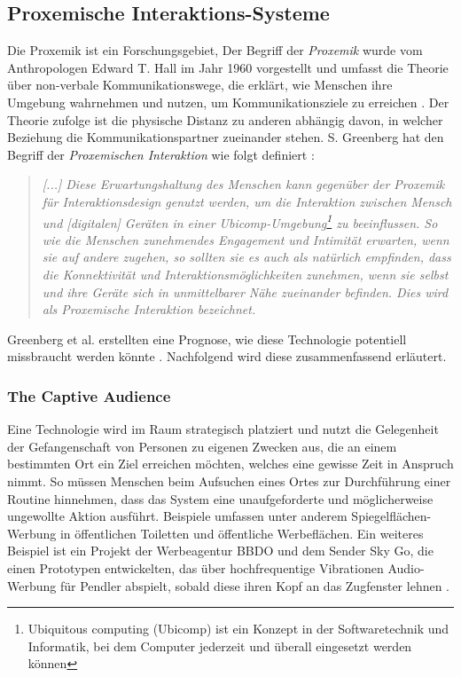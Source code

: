 \documentclass[a4paper]{article}
\begin{document}
\subsection{Proxemische Interaktions-Systeme}
\label{sub:proxemische_interaktions-systeme}{}
Die Proxemik ist ein Forschungsgebiet, 
Der Begriff der \textit{Proxemik} wurde vom Anthropologen Edward T. Hall im Jahr 1960 vorgestellt und umfasst die Theorie über non-verbale Kommunikationswege, die erklärt, wie Menschen ihre Umgebung wahrnehmen und nutzen, um Kommunikationsziele zu erreichen \cite{communicationstudies}. Der Theorie zufolge ist die physische Distanz zu anderen abhängig davon, in welcher Beziehung die Kommunikationspartner zueinander stehen. S. Greenberg hat den Begriff der \textit{Proxemischen Interaktion} wie folgt definiert \cite{marquardt}:\newline 
\begin{quote}
\textit{[...] Diese Erwartungshaltung des Menschen kann gegenüber der Proxemik für Interaktionsdesign genutzt werden, um die Interaktion zwischen Mensch und [digitalen] Geräten in einer Ubicomp-Umgebung\footnote{\label{foot:1}Ubiquitous computing (Ubicomp) ist ein Konzept in der Softwaretechnik und Informatik, bei dem Computer jederzeit und überall eingesetzt werden können} zu beeinflussen. So wie die Menschen zunehmendes Engagement und Intimität erwarten, wenn sie auf andere zugehen, so sollten sie es auch als natürlich empfinden, dass die Konnektivität und Interaktionsmöglichkeiten zunehmen, wenn sie selbst und ihre Geräte sich in unmittelbarer Nähe zueinander befinden. Dies wird als Proxemische Interaktion bezeichnet.}
\end{quote}
Greenberg et al. erstellten eine Prognose, wie diese Technologie potentiell missbraucht werden könnte \cite{greenberg}. Nachfolgend wird diese zusammenfassend erläutert.

\subsubsection{The Captive Audience}
\label{sssec:the_captive_audience}
Eine Technologie wird im Raum strategisch platziert und nutzt die Gelegenheit der \glqq Gefangenschaft\grqq{} von Personen zu eigenen Zwecken aus, die an einem bestimmten Ort ein Ziel erreichen möchten, welches eine gewisse Zeit in Anspruch nimmt. So müssen Menschen beim Aufsuchen eines Ortes zur Durchführung einer Routine hinnehmen, dass das System eine unaufgeforderte und möglicherweise ungewollte Aktion ausführt.\newline
Beispiele umfassen unter anderem Spiegelflächen-Werbung in öffentlichen Toiletten \cite{youtube} und öffentliche Werbeflächen. Ein weiteres Beispiel ist ein Projekt der Werbeagentur BBDO und dem Sender Sky Go, die einen Prototypen entwickelten, das über hochfrequentige Vibrationen Audio-Werbung für Pendler abspielt, sobald diese ihren Kopf an das Zugfenster lehnen \cite{zugfenster_ad}.  
\end{document}
